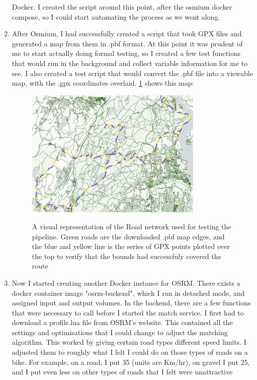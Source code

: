 \documentclass[11pt,a4paper]{report}
\begin{document}
\begin{enumerate}
	      Docker. I created the script around this point, after the osmium docker compose, so I could start automating the process as we went along.
	\item After Osmium, I had successfully created a script that took GPX files and generated a map from them in .pbf format. At this point it was prudent of me to start
	      actually doing formal testing, so I created a few test functions that would run in the background and collect variable information for me to see. I also created
	      a test script that would convert the .pbf file into a viewable map, with the .gpx coordinates overlaid. \ref{fig:pbfmap} shows this map:
	      \begin{figure}
		      \centering
		      \includegraphics[width=0.8\textwidth]{pbf_map.png}
		      \label{fig:pbfmap}
		      \caption{A visual representation of the Road network used for testing the pipeline. Green roads are the downloaded .pbf map edges, and the blue and yellow
			      line is the series of GPX points plotted over the top to verify that the bounds had successfuly covered the route}
	      \end{figure}
	\item Now I started creating another Docker instance for OSRM. There exists a docker container image "osrm-backend", which I ran in detached mode, and assigned input and output volumes.
	      In the backend, there are a few functions that were necessary to call before I started the match service. I first had to download a profile.lua file from OSRM's website. This
	      contained all the settings and optimisations that I could change to adjust the matching algorithm. This worked by giving certain road types different speed limits. I adjusted them to roughly what
	      I felt I could do on those types of roads on a bike. For example, on a road, I put 35 (units are Km/hr), on gravel I put 25, and I put even less on other types of roads that I felt were unattractive

\end{enumerate}
\end{document}

